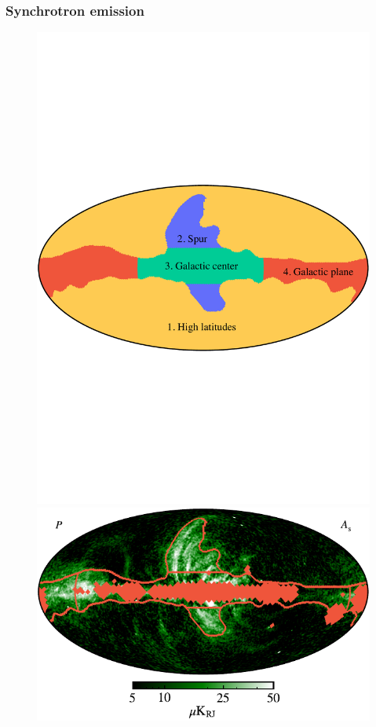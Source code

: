 \documentclass[twocolumn]{aa}
\newcommand{\?}[1]{\textcolor{red}{{\bf [#1]}}}
\begin{document}
\subsubsection{Synchrotron emission}
\label{sec:synch_model}

\begin{figure}[t] 
\center 
\includegraphics[trim=0 250 0 250,width=\linewidth]{figs/UF_sindex_4regions_T_w12_n1024_c-Plotly-4_labeled.pdf}
\includegraphics[width=\linewidth]{figs/synch_P_dx12_T_w12_n1024_cb_masked_c-black2green2white.pdf}\\ 

\end{figure}
\end{document}
